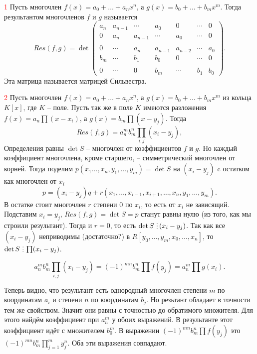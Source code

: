 \dfn \textcolor{red}{1} Пусть многочлен $f(x)=a_0+\dots+a_nx^n$, а $g(x)=b_0+\dots+b_mx^m$. Тогда результантом многочленов $f$ и $g$ называется $$Res(f,g)=  \det 
\begin{pmatrix}
a_n & a_{n-1} & \cdots & a_0 & 0 & \cdots & 0 \\
0 & a_n & a_{n-1} & \cdots & a_0 & \cdots & 0 \\
\\
0 & \cdots &  a_n & a_{n-1} & a_{n-2} & \cdots &  a_0 \\
b_m & \cdots & b_1 & b_0 & 0 & \cdots & 0 \\
 \\
0 & \cdots & 0 & b_m & \cdots & b_1 & b_0 
\end{pmatrix}.$$
Эта матрица называется матрицей Сильвестра. 
\edfn

\dfn \textcolor{red}{2} Пусть многочлен $f(x)=a_0+\dots+a_nx^n$, а $g(x)=b_0+\dots+b_mx^m$ из кольца $K[x]$, где $K$ -- поле. 
Пусть так же в поле $K$ имеются разложения $f(x)=a_n\prod(x-x_i)$, а $g(x)=b_m\prod (x-y_j)$. Тогда
$$Res(f,g)=a_n^mb_m^n \prod_{i,j} (x_i-y_j),$$ \edfn
\thrm Определения равны
\ethrm
\proof $\det S$ -- многочлен от коэффициентов $f$ и $g$. Но каждый коэффициент многочлена, кроме старшего, -- симметрический многочлен от корней.
Тогда поделим $p(x_1\dots,x_n,y_1,\dots,y_m)=\det S$ на $(x_i-y_j)$ c остатком как многочлен от $x_i$
$$p=(x_i-y_j)q+r(x_1,\dots, x_{i-1},x_{i+1},\dots,x_n,y_1,\dots,y_m).$$
В остатке стоит многочлен $r$ степени 0 по $x_i$, то есть от $x_i$ не зависящий. Подставим $x_i = y_j$, $Res(f, g) = \det S = p$ станут равны нулю (из того, как мы строили результант). Тогда и $r=0$, то есть $\det S \di (x_i-y_j)$. Так как все $(x_i - y_j)$ неприводимы (достаточно?) в $R[y_0, \ldots, y_m, x_0, \ldots, x_n]$, то $\det S \di \prod (x_i-y_j)$. 



\lm  $$a_n^mb_m^n \prod_{i,j} (x_i-y_j)=(-1)^{mn}b_m^n \prod f(y_j)=a_n^m \prod g(x_i).$$ 
\elm

Теперь видно, что результант есть однородный многочлен степени $m$ по координатам $a_i$ и степени $n$ по координатам $b_j$. Но резьтант обладает в точности тем же свойством. Значит они равны с точностью до обратимого множителя. Для этого найдём коэффициент при $a_n^m$ у обоих выражений. В результанте этот коэффициент идёт с множителем $b_0^m$. В выражении  $(-1)^{mn}b_m^n \prod f(y_j)$ это $(-1)^{mn}b_m^n \prod_{j=1}^m y_j^n$. Оба эти выражения совпадают.

\endproof
